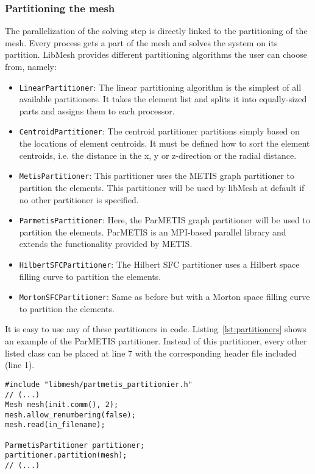   \subsubsection{Partitioning the mesh}\label{sec:Impl-Parallel-Partitioning}
   The parallelization of the solving step is directly linked to the partitioning of the mesh. Every process gets a part of the mesh and solves the system on its partition. LibMesh provides different partitioning algorithms the user can choose from, namely:
   \begin{itemize}
   	\item \texttt{LinearPartitioner}: The linear partitioning algorithm is the simplest of all available partitioners. It takes the element list and splits it into equally-sized parts and assigns them to each processor.
   	\item \texttt{CentroidPartitioner}: The centroid partitioner partitions simply based on the locations of element centroids. It must be defined how to sort the element centroids, i.e. the distance in the x, y or z-direction or the radial distance.
   	\item \texttt{MetisPartitioner}: This partitioner uses the METIS graph partitioner to partition the elements. This partitioner will be used by libMesh at default if no other partitioner is specified.
   	\item \texttt{ParmetisPartitioner}: Here, the ParMETIS graph partitioner will be used to partition the elements. ParMETIS is an MPI-based parallel library and extends the functionality provided by METIS.
   	\item \texttt{HilbertSFCPartitioner}: The Hilbert SFC partitioner uses a Hilbert space filling curve to partition the elements.
   	\item \texttt{MortonSFCPartitioner}: Same as before but with a Morton space filling curve to partition the elements.
   \end{itemize}
   It is easy to use any of these partitioners in code. Listing~\ref{lst:partitioners} shows an example of the ParMETIS partitioner. Instead of this partitioner, every other listed class can be placed at line 7 with the corresponding header file included (line 1).
\begin{lstlisting}[caption=Mesh partitioning example,label=lst:partitioners,keepspaces=true]
#include "libmesh/partmetis_partitionier.h"
// (...)
Mesh mesh(init.comm(), 2);
mesh.allow_renumbering(false);
mesh.read(in_filename);	

ParmetisPartitioner partitioner;
partitioner.partition(mesh);
// (...)
\end{lstlisting}
  

